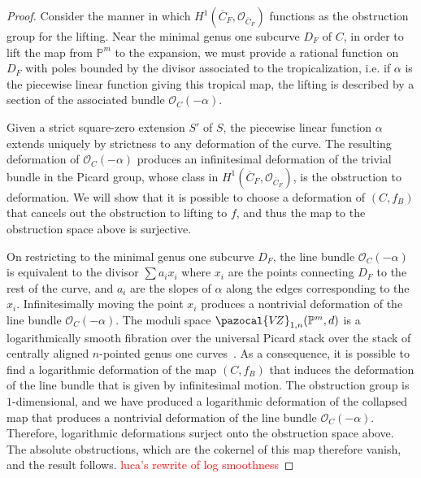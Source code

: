 \documentclass[11pt]{amsart}
\newcommand{\VZ}{\pazocal{V\!Z}}
\renewcommand{\to}{\rightarrow}
\theoremstyle{definition}
\theoremstyle{definition}
\begin{document}
\begin{proof}
Consider the manner in which $H^1(\overline{C}_F,\mathcal O_{\overline{C}_F})$ functions as the obstruction group for the lifting. Near the minimal genus one subcurve $D_F$ of $C$, in order to lift the map from $\mathbb P^m$ to the expansion, we must provide a rational function on $D_F$ with poles bounded by the divisor associated to the tropicalization, i.e. if $\alpha$ is the piecewise linear function giving this tropical map, the lifting is described by a section of the associated bundle $\mathcal O_{C}(-\alpha)$.

Given a strict square-zero extension $S'$ of $S$, the piecewise linear function $\alpha$ extends uniquely by strictness to any deformation of the curve. The resulting deformation of $\mathcal O_{C}(-\alpha)$ produces an infinitesimal deformation of the trivial bundle in the Picard group, whose class in $H^1(\overline{C}_F,\mathcal O_{\overline{C}_F})$, is the obstruction to deformation. We will show that it is possible to choose a deformation of $(C,f_B)$ that cancels out the obstruction to lifting to $f$, and thus the map to the obstruction space above is surjective. 

On restricting to the minimal genus one subcurve $D_F$, the line bundle $\mathcal O_{C}(-\alpha)$ is equivalent to the divisor $\sum a_i x_i$ where $x_i$ are the points connecting $D_F$ to the rest of the curve, and $a_i$ are the slopes of $\alpha$ along the edges corresponding to the $x_i$. Infinitesimally moving the point $x_i$ produces a nontrivial deformation of the line bundle $\mathcal O_{C}(-\alpha)$. The moduli space $\VZ_{1,n}(\mathbb P^m,d)$ is a logarithmically smooth fibration over the universal Picard stack over the stack of centrally aligned $n$-pointed genus one curves~\cite[Remark~4.5.3]{RSPW}. As a consequence, it is possible to find a logarithmic deformation of the map $(C,f_B)$ that induces the deformation of the line bundle that is given by infinitesimal motion. The obstruction group is $1$-dimensional, and we have produced a logarithmic deformation of the collapsed map that produces a nontrivial deformation of the line bundle $\mathcal O_{C}(-\alpha)$. Therefore, logarithmic deformations surject onto the obstruction space above. The absolute obstructions, which are the cokernel of this map therefore vanish, and the result follows.  
\textcolor{red}{luca's rewrite of log smoothness}


\end{proof}
\end{document}
